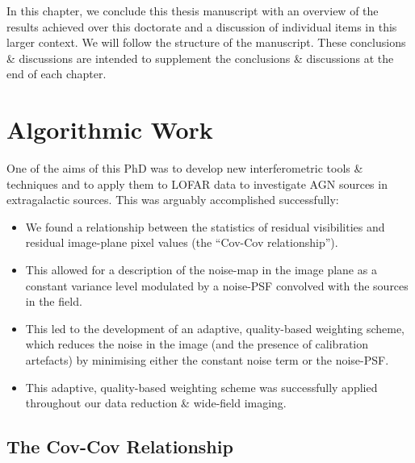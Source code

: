 \minitoc

\pg
In this chapter, we conclude this thesis manuscript with an overview of the results achieved over this doctorate and a discussion of individual items in this larger context. We will follow the structure of the manuscript. These conclusions \& discussions are intended to supplement the conclusions \& discussions at the end of each chapter.



\clearpage

\section{Algorithmic Work}

\pg
One of the aims of this PhD was to develop new interferometric tools \& techniques and to apply them to LOFAR data to investigate AGN sources in extragalactic sources. This was arguably accomplished successfully:
\begin{itemize}
\item We found a relationship between the statistics of residual visibilities and residual image-plane pixel values (the ``Cov-Cov relationship'').
\item This allowed for a description of the noise-map in the image plane as a constant variance level modulated by a noise-PSF convolved with the sources in the field.
\item This led to the development of an adaptive, quality-based weighting scheme, which reduces the noise in the image (and the presence of calibration artefacts) by minimising either the constant noise term or the noise-PSF.
\item This adaptive, quality-based weighting scheme was successfully applied throughout our data reduction \& wide-field imaging.
\end{itemize}

\subsection{The Cov-Cov Relationship}

